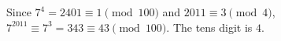 Since $7^4=2401\equiv 1\pmod{100}$ and $2011\equiv 3\pmod 4$, $7^{2011}\equiv 7^3=343\equiv 43\pmod{100}$. The tens digit is $\boxed 4$.
